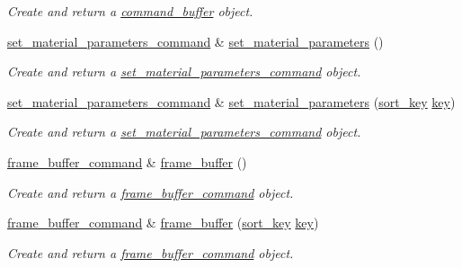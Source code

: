 \begin{DoxyCompactItemize}
\begin{DoxyCompactList}\small\item\em Create and return a \mbox{\hyperlink{classmoka_1_1command__buffer}{command\+\_\+buffer}} object. \end{DoxyCompactList}\item 
\mbox{\hyperlink{classmoka_1_1set__material__parameters__command}{set\+\_\+material\+\_\+parameters\+\_\+command}} \& \mbox{\hyperlink{classmoka_1_1command__list_a5383b94dfc9fe4cce43797b09b9b00d3}{set\+\_\+material\+\_\+parameters}} ()
\begin{DoxyCompactList}\small\item\em Create and return a \mbox{\hyperlink{classmoka_1_1set__material__parameters__command}{set\+\_\+material\+\_\+parameters\+\_\+command}} object. \end{DoxyCompactList}\item 
\mbox{\hyperlink{classmoka_1_1set__material__parameters__command}{set\+\_\+material\+\_\+parameters\+\_\+command}} \& \mbox{\hyperlink{classmoka_1_1command__list_af9edd3720785c82b0ead65d477ec3a38}{set\+\_\+material\+\_\+parameters}} (\mbox{\hyperlink{namespacemoka_afa30a616e67b83113ebdb857555cf2bb}{sort\+\_\+key}} \mbox{\hyperlink{namespacemoka_a45a36b05a9b9eddb028d6c60305ae71d}{key}})
\begin{DoxyCompactList}\small\item\em Create and return a \mbox{\hyperlink{classmoka_1_1set__material__parameters__command}{set\+\_\+material\+\_\+parameters\+\_\+command}} object. \end{DoxyCompactList}\item 
\mbox{\hyperlink{classmoka_1_1frame__buffer__command}{frame\+\_\+buffer\+\_\+command}} \& \mbox{\hyperlink{classmoka_1_1command__list_a2c25cc351ff4ed1b62ab37820d534352}{frame\+\_\+buffer}} ()
\begin{DoxyCompactList}\small\item\em Create and return a \mbox{\hyperlink{classmoka_1_1frame__buffer__command}{frame\+\_\+buffer\+\_\+command}} object. \end{DoxyCompactList}\item 
\mbox{\hyperlink{classmoka_1_1frame__buffer__command}{frame\+\_\+buffer\+\_\+command}} \& \mbox{\hyperlink{classmoka_1_1command__list_ae9b5c5bdd4aa13fc55ae20b3afb6265b}{frame\+\_\+buffer}} (\mbox{\hyperlink{namespacemoka_afa30a616e67b83113ebdb857555cf2bb}{sort\+\_\+key}} \mbox{\hyperlink{namespacemoka_a45a36b05a9b9eddb028d6c60305ae71d}{key}})
\begin{DoxyCompactList}\small\item\em Create and return a \mbox{\hyperlink{classmoka_1_1frame__buffer__command}{frame\+\_\+buffer\+\_\+command}} object. \end{DoxyCompactList}\item 

\end{DoxyCompactItemize}
